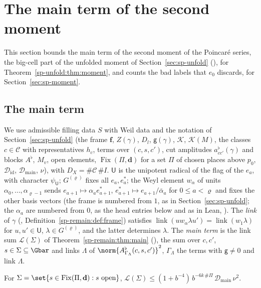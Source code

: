\section{The main term of the second moment}\label{sec:sp-main}

This section bounds the main term of the second moment of the Poincaré series, the big-cell part of
the unfolded moment of Section~\ref{sec:sp-unfold} (), for
Theorem~\ref{sp-unfold:thm:moment}, and counts the bad labels that $e_0$ discards, for
Section~\ref{sec:sp-moment}.

\subsection{The main term}\label{sp-main:ss:main}

We use admissible filling data $S$ with Weil data and the notation of
Section~\ref{sec:sp-unfold} (the frame $\mathbf f$, $Z(\gamma)$, $D_l$, $\mathsf g(\gamma)$, $\mathcal K$,
$\mathcal K(M)$, the classes $c\in\mathcal C$ with representatives $h_c$, terms over $(c,s,c')$, cut
amplitudes $a^\flat_{cc'}(\gamma)$ and blocks $A^\flat$, $M_v$, open elements,
$\operatorname{Fix}(\Pi,\mathbf d)$ for a set $\Pi$ of chosen places above $p_0$, $\mathcal D_{\mathrm{id}}$,
$\mathcal D_{\mathrm{main}}$, $\nu$), with $D_X=\#\mathcal C\,\#I$. $\mathsf U$ is the unipotent radical of the flag of the $e_a$, with
character $\psi_{\mathsf U}$; $G^{(\varrho)}$ fixes all $e_a,e_a^*$; the Weyl element $w_\alpha$ of
units $\alpha_0,\dots,\alpha_{\varrho-1}$ sends $e_{a+1}\mapsto\alpha_ae_{a+1}^*$,
$e_{a+1}^*\mapsto e_{a+1}/\bar\alpha_a$ for $0\le a<\varrho$ and fixes the other basis vectors (the
frame is numbered from $1$, as in Section~\ref{sec:sp-unfold}; the $\alpha_a$ are numbered from $0$,
as the head entries below and as in Lean, ). The \emph{link} of
$\gamma$ (, Definition~\ref{sp-remain:def:frame}) satisfies
$\operatorname{link}(uw_\alpha\lambda u')=\operatorname{link}(w_1\lambda)$ for $u,u'\in\mathsf U$,
$\lambda\in G^{(\varrho)}$, and the latter determines $\lambda$. The \emph{main term} is the link sum
$\mathcal L(\Sigma)$ of Theorem~\ref{sp-remain:thm:main} (), the
sum over $c,c'$, $s\in\Sigma\subseteq\Gbar$ and links $\Lambda$ of $\norm{A^\flat_{\Gamma_\Lambda}(c,s,c')}^2$,
$\Gamma_\Lambda$ the terms with $\mathsf g\ne0$ and link $\Lambda$.

\begin{theorem}
\label{sp-main:thm:main}
For $\Sigma=\set{s\in\operatorname{Fix}(\Pi,\mathbf d): s\text{ open}}$,\quad
$\mathcal L(\Sigma)\le(1+b^{-4})\,b^{-6k\,\#\Pi}\,\mathcal D_{\mathrm{main}}\,\nu^2$.
\end{theorem}

